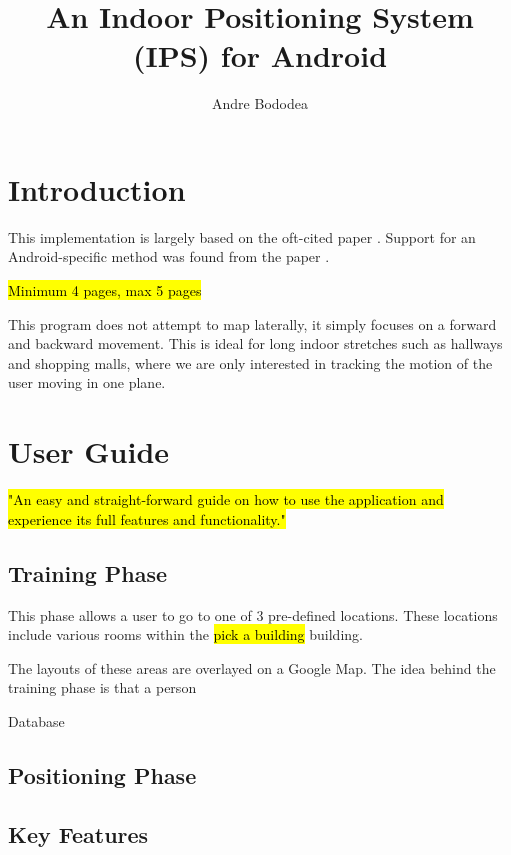 \documentclass[twocolumn]{article}
\begin{document}
\title{An Indoor Positioning System (IPS) for Android}
\author{Andre Bododea}
\date{\vspace{1em}} %

\maketitle

\section*{Introduction}
This implementation is largely based on the oft-cited paper \cite{kaemarungsi2004modeling}. Support for an Android-specific method was found from the paper \cite{shchekotov2014indoor}.

\hl{Minimum 4 pages, max 5 pages}

This program does not attempt to map laterally, it simply focuses on a forward and backward movement. This is ideal for long indoor stretches such as hallways and shopping malls, where we are only interested in tracking the motion of the user moving in one plane.



\section*{User Guide}

\hl{"An easy and straight-forward guide on how to use the application and experience
its full features and functionality."}

\subsection*{Training Phase}

This phase allows a user to go to one of 3 pre-defined locations. These locations include various rooms within the \hl{pick a building} building.

The layouts of these areas are overlayed on a Google Map. The idea behind the training phase is that a person

Database

\subsection*{Positioning Phase}

\subsection*{Key Features}
\end{document}
